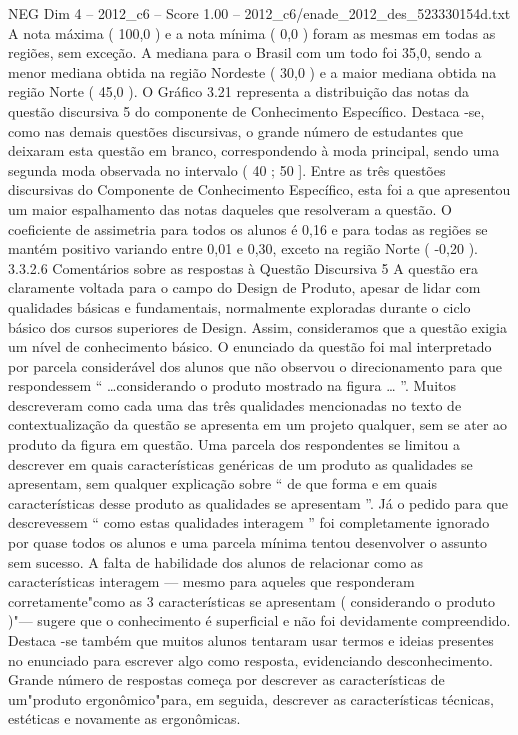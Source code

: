 \begin{textsample}{NEG Dim 4 – 2012\_c6 – Score 1.00 – 2012\_c6/enade\_2012\_des\_523330154d.txt}
A nota máxima ( 100,0 ) e a nota mínima ( 0,0 ) foram as mesmas em todas as regiões, sem exceção.
A mediana para o Brasil com um todo foi 35,0, sendo a menor mediana obtida na região Nordeste ( 30,0 ) e a maior mediana obtida na região Norte ( 45,0 ).
O Gráfico 3.21 representa a distribuição das notas da questão discursiva 5 do componente de Conhecimento Específico.
Destaca -se, como nas demais questões discursivas, o grande número de estudantes que deixaram esta questão em branco, correspondendo à moda principal, sendo uma segunda moda observada no intervalo ( 40 ; 50 ].
Entre as três questões discursivas do Componente de Conhecimento Específico, esta foi a que apresentou um maior espalhamento das notas daqueles que resolveram a questão.
O coeficiente de assimetria para todos os alunos é 0,16 e para todas as regiões se mantém positivo variando entre 0,01 e 0,30, exceto na região Norte ( -0,20 ). 3.3.2.6 Comentários sobre as respostas à Questão Discursiva 5 A questão era claramente voltada para o campo do Design de Produto, apesar de lidar com qualidades básicas e fundamentais, normalmente exploradas durante o ciclo básico dos cursos superiores de Design.
Assim, consideramos que a questão exigia um nível de conhecimento básico.
O enunciado da questão foi mal interpretado por parcela considerável dos alunos que não observou o direcionamento para que respondessem “ …considerando o produto mostrado na figura … ”.
Muitos descreveram como cada uma das três qualidades mencionadas no texto de contextualização da questão se apresenta em um projeto qualquer, sem se ater ao produto da figura em questão.
Uma parcela dos respondentes se limitou a descrever em quais características genéricas de um produto as qualidades se apresentam, sem qualquer explicação sobre “ de que forma e em quais características desse produto as qualidades se apresentam ”.
Já o pedido para que descrevessem “ como estas qualidades interagem ” foi completamente ignorado por quase todos os alunos e uma parcela mínima tentou desenvolver o assunto sem sucesso.
A falta de habilidade dos alunos de relacionar como as características interagem — mesmo para aqueles que responderam corretamente"como as 3 características se apresentam ( considerando o produto )"— sugere que o conhecimento é superficial e não foi devidamente compreendido.
Destaca -se também que muitos alunos tentaram usar termos e ideias presentes no enunciado para escrever algo como resposta, evidenciando desconhecimento.
Grande número de respostas começa por descrever as características de um"produto ergonômico"para, em seguida, descrever as características técnicas, estéticas e novamente as ergonômicas.

\end{textsample}
